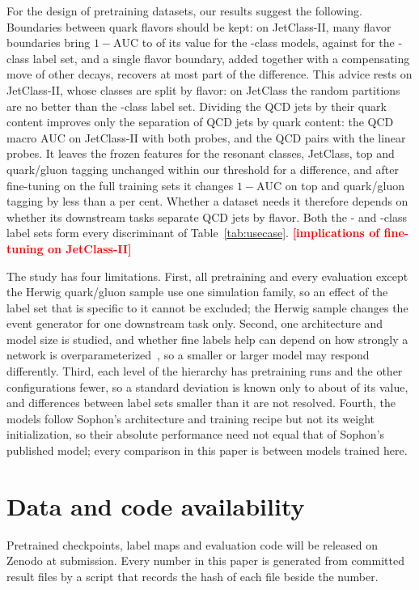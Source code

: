 \documentclass[11pt]{article}
\newcommand{\pending}[1]{\textcolor{red}{\textbf{[#1]}}}
\newcommand{\Kfull}{\VocabSizeLoneeighteight}
\newcommand{\Kres}{\VocabSizeLonesixtwo}
\newcommand{\Kcoarse}{\VocabSizeRonesixQone}
\newcommand{\oma}{\ensuremath{1-\mathrm{AUC}}}
\begin{document}
For the design of pretraining datasets, our results suggest the following. Boundaries between
quark flavors should be kept: on JetClass-II, many flavor boundaries bring $\oma$ to
\MlstCmpJcTwoRandOverFull{} of its value for the \Kfull-class models, against
\MlstCmpJcTwoCoarseOverFull{} for the \Kcoarse-class label set, and a single flavor boundary,
added together with a compensating move of other decays, recovers at most part of the
difference. This advice rests on JetClass-II, whose classes are split by flavor: on JetClass the
random partitions are no better than the \Kcoarse-class label set. Dividing the QCD jets by their quark content improves
only the separation of QCD jets by quark content: the QCD macro AUC on JetClass-II with both
probes, and the QCD pairs with the linear probes. It leaves the frozen features for the resonant
classes, JetClass, top and quark/gluon tagging unchanged within our threshold for a difference,
and after fine-tuning on the full training sets it changes $\oma$ on top and quark/gluon tagging
by less than a per cent. Whether a dataset needs it therefore depends on whether its downstream tasks
separate QCD jets by flavor. Both the \Kfull- and \Kres-class label sets form every discriminant
of Table~\ref{tab:usecase}. \pending{implications of fine-tuning on JetClass-II}

The study has four limitations. First, all pretraining and every evaluation except the Herwig
quark/gluon sample use one simulation family, so an effect of the label set that is specific to it
cannot be excluded; the Herwig sample changes the event generator for one downstream task only. Second, one architecture and model size is studied, and whether fine labels help can
depend on how strongly a network is overparameterized~\cite{pirovano}, so a smaller or larger model
may respond differently. Third, each level of the hierarchy has \MlstNRunsWord{} pretraining runs and
the other configurations fewer, so a standard deviation is known only to about \MlstSdRelUnc{} of its
value, and differences between label sets smaller than it are not resolved. Fourth, the models follow
Sophon's architecture and training recipe but not its weight initialization, so their absolute
performance need not equal that of Sophon's published model; every comparison in this paper is between
models trained here.

\section*{Data and code availability}
Pretrained checkpoints, label maps and evaluation code will be released on Zenodo at
submission. Every number in this paper is generated from committed result files by a
script that records the hash of each file beside the number.
\end{document}
